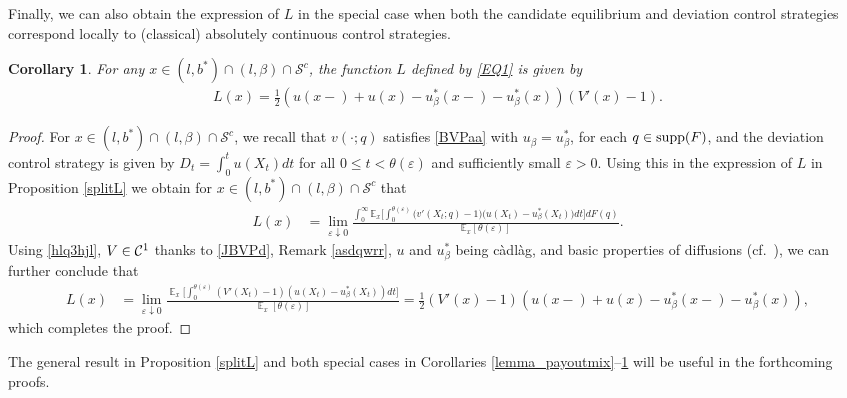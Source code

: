 \documentclass[11pt]{article} %
\newtheorem{corollary}[theorem]{Corollary}
\DeclareMathOperator{\E}{\mathbb E}
\numberwithin{komcounter}{section}
\renewcommand{\epsilon}{\varepsilon}
\def\bl{\textcolor{blue}} %
\begin{document}
Finally, we can also obtain the expression of $L$ in the special case when both the candidate equilibrium and deviation control strategies correspond locally to (classical) absolutely continuous control strategies. 


\begin{corollary} \label{lemma_bothmix} 
For any $x\in (l,b^*) \cap (l,\beta) \cap \mathcal{S}^c$, the function $L$ defined by \eqref{EQ1} is given by 
\begin{align*}
L(x) = \frac{1}{2}\left(u(x-)+u(x)-u_\beta^*(x-)-u_\beta^*(x)\right)(V'(x)-1).
\end{align*}
\end{corollary}
\begin{proof} 
For $x \in (l,b^*) \cap (l,\beta) \cap \mathcal{S}^c$, we recall that $v(\cdot;q)$ satisfies \eqref{BVPaa} with $u_\beta=u_\beta^*$, for each $q \in {\rm supp}(F)$, and the deviation control strategy is given by $D_t = \int_0^t u(X_t) dt$ for all $0\leq t < \theta(\epsilon)$ and sufficiently small $\epsilon>0$. 
Using this in the expression of $L$ in Proposition \ref{splitL} we obtain for $x \in (l,b^*) \cap (l,\beta) \cap \mathcal{S}^c$ that 
\begin{align*} 
L(x) 
&= \lim_{\epsilon \downarrow 0} \frac{\int_0^\infty \mathbb{E}_x \big[\int_0^{\theta(\epsilon)} \big(v'(X_{t};q) - 1 \big) \big(u(X_t) - u_\beta^*(X_t)\big) dt \big] dF(q)}{\mathbb{E}_x[\theta(\epsilon)]}.   
\end{align*}
Using \eqref{hlq3hjl}, $V \in {\cal C}^1$ thanks to \eqref{JBVPd}, Remark \ref{asdqwrr}, $u$ and $u_\beta^*$ being c\`adl\`ag, and basic properties of diffusions (cf.~\cite[Lemma A.4]{christensen2025time}), we can further conclude that  
\begin{align*}
L(x) 
&= \lim_{\epsilon\downarrow 0}\frac{\E_x\big[ \int_0^{\theta(\epsilon)}(V'(X_t)-1)(u(X_t) - u_\beta^*(X_t)) dt\big]}{\E_x[\theta(\epsilon)]} 
= \frac{1}{2}(V'(x)-1)\left(u(x-)+u(x)-u_\beta^*(x-)-u_\beta^*(x)\right),
\end{align*}
which completes the proof.
\end{proof}

The general result in Proposition \ref{splitL} and both special cases in Corollaries \ref{lemma_payoutmix}--\ref{lemma_bothmix} will be useful in the forthcoming proofs.
\end{document}
